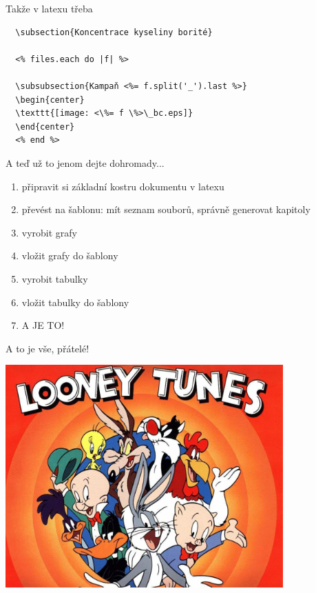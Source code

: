 \documentclass{beamer}
\begin{document}
\begin{frame}[fragile]{Takže v latexu třeba}
\scriptsize
\begin{verbatim}
  \subsection{Koncentrace kyseliny borité}

  <% files.each do |f| %>

  \subsubsection{Kampaň <%= f.split('_').last %>}
  \begin{center}
  \texttt{[image: <\%= f \%>\_bc.eps]}
  \end{center}
  <% end %>
\end{verbatim}
\end{frame}

\begin{frame}{A teď už to jenom dejte dohromady...}
  \begin{enumerate}
    \item připravit si základní kostru dokumentu v latexu
    \item převést na šablonu: mít seznam souborů, správně generovat kapitoly
    \item vyrobit grafy
    \item vložit grafy do šablony
    \item vyrobit tabulky
    \item vložit tabulky do šablony
    \item A JE TO!
  \end{enumerate}
\end{frame}


\begin{frame}{A to je vše, přátelé!}
  \begin{center}
    \includegraphics[width=0.8\textwidth]{looney_tunes}
  \end{center}
\end{frame}
\end{document}
